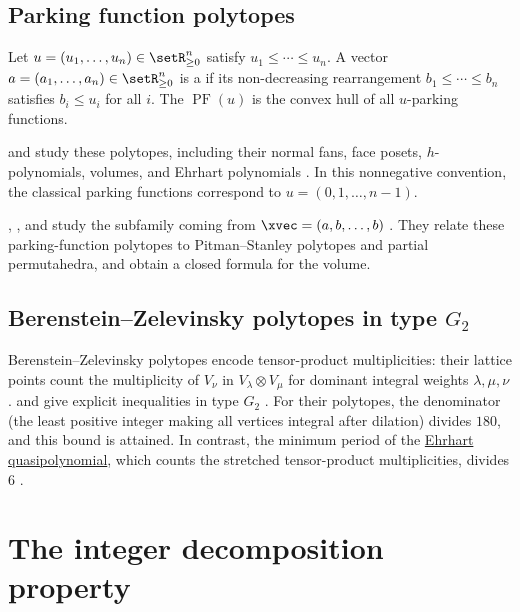 \subsection[parkingFunctionPolytope]{Parking function polytopes}

Let $u=(u_1,\dotsc,u_n)\in\setR_{\geq 0}^n$ satisfy
$u_1\leq\dotsb\leq u_n$.  A vector
$a=(a_1,\dotsc,a_n)\in\setR_{\geq 0}^n$ is a 
if its non-decreasing rearrangement $b_1\leq\dotsb\leq b_n$ satisfies
$b_i\leq u_i$ for all $i$.  The
\label{parkingFunctionPolytopeDefinition}
$\operatorname{PF}(u)$ is the convex hull of all $u$-parking functions.

 and  study these polytopes, including
their normal fans, face posets, $h$-polynomials, volumes, and Ehrhart
polynomials \cite{LiuThawinrak2025x}.  In this nonnegative convention,
the classical parking functions correspond to $u=(0,1,\dotsc,n-1)$.

, , and
 study the
subfamily coming from $\xvec=(a,b,\dotsc,b)$ \cite{HanadaLentferVindasMelendez2023}.
They relate these parking-function polytopes to Pitman--Stanley polytopes and
partial permutahedra, and obtain a closed formula for the volume.


\subsection[bzPolytopesG2]{Berenstein--Zelevinsky polytopes in type $G_2$}

Berenstein--Zelevinsky polytopes encode tensor-product multiplicities:
their lattice points count the multiplicity of $V_\nu$ in
$V_\lambda\otimes V_\mu$ for dominant integral weights $\lambda,\mu,\nu$.
 and  give explicit
inequalities in type $G_2$ \cite[Thm.~1.2]{MagnusonMcAllister2026x}.
For their polytopes, the denominator (the least positive integer making
all vertices integral after dilation) divides $180$, and this bound is
attained. In contrast, the minimum period of the
\hyperref[ehrhartPolytopes]{Ehrhart quasipolynomial}, which counts the
stretched tensor-product multiplicities, divides $6$
\cite[Thms.~1.7--1.8]{MagnusonMcAllister2026x}.

\section[polytopeIDP]{The integer decomposition property}

